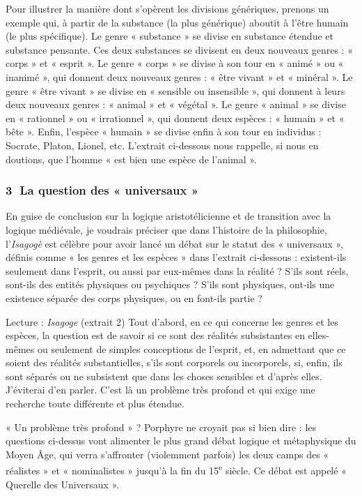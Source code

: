 Pour illustrer la manière dont s’opèrent les divisions génériques, prenons un exemple qui, à partir de la substance (la plus générique) aboutit à l’être humain (le plus spécifique). Le genre « substance » se divise en substance étendue et substance pensante. Ces deux substances se divisent en deux nouveaux genres : « corps » et « esprit ». Le genre « corps » se divise à son tour en « animé » ou « inanimé », qui donnent deux nouveaux genres : « être vivant » et « minéral ». Le genre « être vivant » se divise en « sensible ou insensible », qui donnent à leurs deux nouveaux genres : « animal » et « végétal ». Le genre « animal » se divise en « rationnel » ou « irrationnel », qui donnent deux espèces : « humain » et « bête ». Enfin, l’espèce « humain » se divise enfin à son tour en individus : Socrate, Platon, Lionel, etc. L’extrait ci-dessous nous rappelle, si nous en doutions, que l’homme « est bien une espèce de l’animal ».

\subsubsection*{\textcircled{\scriptsize 3} La question des « universaux »}
En guise de conclusion sur la logique aristotélicienne et de transition avec la logique médiévale, je voudrais préciser que dans l’histoire de la philosophie, l’\textit{Isagogè} est célèbre pour avoir lancé un débat sur le statut des « universaux », définis comme « les genres et les espèces » dans l’extrait ci-dessous : existent-ils seulement dans l’esprit, ou aussi par eux-mêmes dans la réalité ? S’ils sont réels, sont-ils des entités physiques ou psychiques ? S’ils sont physiques, ont-ils une existence séparée des corps physiques, ou en font-ils partie ?

\begin{lecture}{Lecture : \textit{Isagoge} (extrait 2)}
Tout d’abord, en ce qui concerne les genres et les espèces, la question est de savoir si ce sont des réalités subsistantes en elles-mêmes ou seulement de simples conceptions de l’esprit, et, en admettant que ce soient des réalités substantielles, s’ils sont corporels ou incorporels, si, enfin, ils sont séparés ou ne subsistent que dans les choses sensibles et d’après elles. J’éviterai d’en parler. C’est là un problème très profond et qui exige une recherche toute différente et plus étendue.
\end{lecture}

« Un problème très profond » ? Porphyre ne croyait pas si bien dire : les questions ci-dessus vont alimenter le plus grand débat logique et métaphysique du Moyen Âge, qui verra s’affronter (violemment parfois) les deux camps des « réalistes » et « nominalistes » jusqu’à la fin du 15\textsuperscript{e} siècle. Ce débat est appelé « Querelle des Universaux ».

